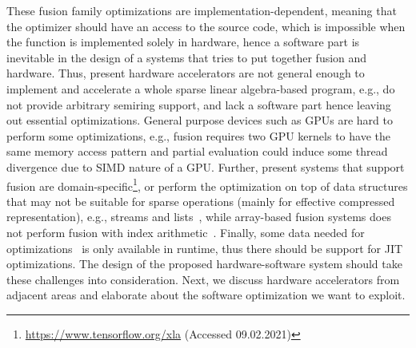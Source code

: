 \documentclass[10pt,conference]{IEEEtran}
\newcommand\question[1]{{\color{violet}#1}}
\newcommand\todo[1]{{\color{red}#1}}
\begin{document}
These fusion family optimizations are implementation-dependent, meaning that the optimizer should have an access to the source code, which is impossible when the function is implemented solely in hardware, hence a software part is inevitable in the design of a systems that tries to put together fusion and hardware.
Thus, present hardware accelerators are not general enough to implement and accelerate a whole sparse linear algebra-based program, e.g., do not provide arbitrary semiring support, and lack a software part hence leaving out essential optimizations.
General purpose devices such as GPUs are hard to perform some optimizations, e.g., fusion requires two GPU kernels to have the same memory access pattern and partial evaluation could induce some thread divergence due to SIMD nature of a GPU. 
Further, present systems that support fusion are domain-specific\footnote{\url{https://www.tensorflow.org/xla} (Accessed 09.02.2021)}, or perform the optimization on top of data structures that may not be suitable for sparse operations (mainly for effective compressed representation), e.g., streams and lists~\cite{StreamFusion,StreamFusion2}, while array-based fusion systems does not perform fusion with index arithmetic~\cite{Futhark}.
Finally, some data needed for optimizations~\cite{jones} is only available in runtime, thus there should be support for JIT optimizations.
The design of the proposed hardware-software system should take these challenges into consideration. 
Next, we discuss hardware accelerators from adjacent areas and elaborate about the software optimization we want to exploit.




\end{document}
